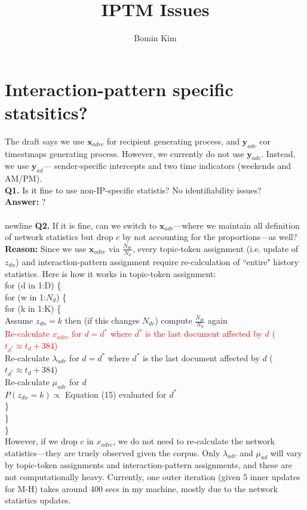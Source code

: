 \documentclass[12pt,a4paper]{article}
\title{IPTM Issues}
\author{Bomin Kim}
\begin{document}
\maketitle
\section{Interaction-pattern specific statsitics?}
The draft says we use $\boldsymbol{x}_{adrc}$ for recipient generating process, and $\boldsymbol{y}_{adc}$ cor timestmaps generating process. However, we currently do not use $\boldsymbol{y}_{adc}$. Instead, we use $\boldsymbol{y}_{ad}$--- sender-specific intercepts and two time indicators (weekends and AM/PM).\\ \newline
\textbf{Q1.} Is it fine to use non-IP-specific statistis? No identifiability issues?\\\newline
\textbf{Answer:} ?\\\\newline 
\textbf{Q2.} If it is fine, can we switch to $\boldsymbol{x}_{adr}$---where we maintain all definition of network statistics but drop $c$ by not accounting for the proportions---as well?\\\newline
\textbf{Reason:} Since we use $\boldsymbol{x}_{adrc}$ via $\frac{N_{dc}}{N_d}$, every topic-token assignment (i.e. update of $z_{dn}$) and interaction-pattern assignment require re-calculation of ``entire" history statistics. Here is how it works in topic-token assignment:\\ \newline
for (d in 1:D) \{\\
for (w in 1:$N_d$) \{\\
for (k in 1:K) \{\\
	Assume $z_{dn}=k$ then (if this changes $N_{dc}$) compute $\frac{N_{dc}}{N_d}$ again\\
	\textcolor{red}{Re-calculate $x_{adrc}$ for $d=d^*$ where $d^*$ is the last document affected by $d$  ($t_{d^*}\approx t_d+384$)}\\
	Re-calculate $\lambda_{adr}$ for $d=d^*$ where $d^*$ is the last document affected by $d$ ($t_{d^*}\approx t_d+384$)\\
	Re-calculate $\mu_{adc}$ for $d$ \\		
	$P(z_{dn}=k) \propto $ Equation (15) evaluated for $d^*$\\
		\}\\
	\}\\
\}\\ \newline
However, if we drop $c$ in $x_{adrc}$, we do not need to re-calculate the network statistics---they are truely observed given the corpus. Only $\lambda_{adr}$ and $\mu_{ad}$ will vary by topic-token assignments and interaction-pattern assignments, and these are not computationally heavy.
Currently, one outer iteration (given 5 inner updates for M-H) takes around 400 secs in my machine, mostly due to the network statistics updates.
\end{document}
